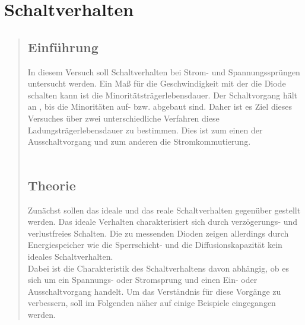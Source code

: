 \newpage

\section{Schaltverhalten}
\begin{quote}
	
	\subsection{Einführung}

	In diesem Versuch soll Schaltverhalten bei Strom- und Spannungssprüngen 
	untersucht werden. Ein Maß für die Geschwindigkeit mit der die Diode schalten 
	kann ist die Minoritätsträgerlebensdauer. Der Schaltvorgang hält an
	, bis die Minoritäten auf- bzw. abgebaut sind. Daher ist es Ziel dieses 
	Versuches über zwei unterschiedliche Verfahren diese Ladungsträgerlebensdauer 
	zu bestimmen. Dies ist zum einen der Ausschaltvorgang und zum anderen 
	die Stromkommutierung.\\
	\\
	\subsection{Theorie}
	
	Zunächst sollen das ideale und das reale Schaltverhalten gegenüber gestellt
	werden. Das ideale Verhalten charakterisiert sich durch verzögerungs- und
	verlustfreies Schalten. Die zu messenden Dioden zeigen allerdings durch
	Energiespeicher wie die Sperrschicht- und die Diffusionskapazität kein
	ideales Schaltverhalten. \\

	Dabei ist die Charakteristik des Schaltverhaltens davon abhängig, ob es
	sich um ein Spannungs- oder Stromsprung und einen Ein- oder Ausschaltvorgang
	handelt. Um das Verständnis für diese Vorgänge zu verbessern, soll im
	Folgenden näher auf einige Beispiele eingegangen werden.\\


\end{quote}
